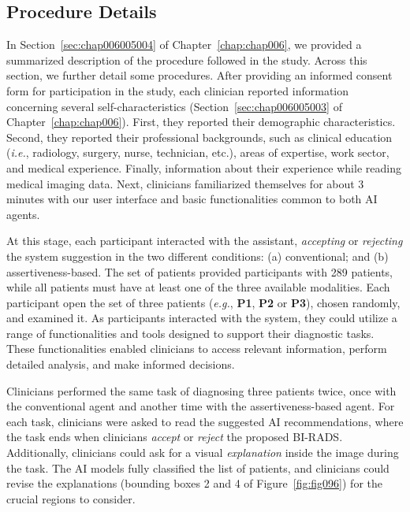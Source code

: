 \subsection{Procedure Details}
\label{sec:app005006004}

In Section~\ref{sec:chap006005004} of Chapter~\ref{chap:chap006}, we provided a summarized description of the procedure followed in the study.
Across this section, we further detail some procedures.
After providing an informed consent form for participation in the study, each clinician reported information concerning several self-characteristics (Section~\ref{sec:chap006005003} of Chapter~\ref{chap:chap006}).
First, they reported their demographic characteristics.
Second, they reported their professional backgrounds, such as clinical education ({\it i.e.}, radiology, surgery, nurse, technician, etc.), areas of expertise, work sector, and medical experience.
Finally, information about their experience while reading medical imaging data.
Next, clinicians familiarized themselves for about 3 minutes with our user interface and basic functionalities common to both \ac{AI} agents.

At this stage, each participant interacted with the assistant, {\it accepting} or {\it rejecting} the system suggestion in the two different conditions: (a) conventional; and (b) assertiveness-based.
The set of patients provided participants with 289 patients, while all patients must have at least one of the three available modalities.
Each participant open the set of three patients ({\it e.g.}, {\bf P1}, {\bf P2} or {\bf P3}), chosen randomly, and examined it.
As participants interacted with the system, they could utilize a range of functionalities and tools designed to support their diagnostic tasks.
These functionalities enabled clinicians to access relevant information, perform detailed analysis, and make informed decisions.

Clinicians performed the same task of diagnosing three patients twice, once with the conventional agent and another time with the assertiveness-based agent.
For each task, clinicians were asked to read the suggested \ac{AI} recommendations, where the task ends when clinicians {\it accept} or {\it reject} the proposed \ac{BI-RADS}.
Additionally, clinicians could ask for a visual {\it explanation} inside the image during the task.
The \ac{AI} models fully classified the list of patients, and clinicians could revise the explanations (bounding boxes 2 and 4 of Figure~\ref{fig:fig096}) for the crucial regions to consider.

